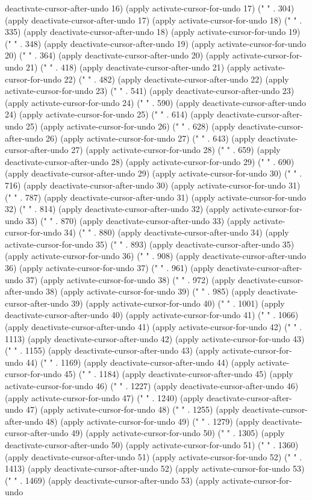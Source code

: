 deactivate-cursor-after-undo 16) (apply activate-cursor-for-undo 17) (" " . 304) (apply deactivate-cursor-after-undo 17) (apply activate-cursor-for-undo 18) (" " . 335) (apply deactivate-cursor-after-undo 18) (apply activate-cursor-for-undo 19) (" " . 348) (apply deactivate-cursor-after-undo 19) (apply activate-cursor-for-undo 20) (" " . 364) (apply deactivate-cursor-after-undo 20) (apply activate-cursor-for-undo 21) (" " . 418) (apply deactivate-cursor-after-undo 21) (apply activate-cursor-for-undo 22) (" " . 482) (apply deactivate-cursor-after-undo 22) (apply activate-cursor-for-undo 23) (" " . 541) (apply deactivate-cursor-after-undo 23) (apply activate-cursor-for-undo 24) (" " . 590) (apply deactivate-cursor-after-undo 24) (apply activate-cursor-for-undo 25) (" " . 614) (apply deactivate-cursor-after-undo 25) (apply activate-cursor-for-undo 26) (" " . 628) (apply deactivate-cursor-after-undo 26) (apply activate-cursor-for-undo 27) (" " . 643) (apply deactivate-cursor-after-undo 27) (apply activate-cursor-for-undo 28) (" " . 659) (apply deactivate-cursor-after-undo 28) (apply activate-cursor-for-undo 29) (" " . 690) (apply deactivate-cursor-after-undo 29) (apply activate-cursor-for-undo 30) (" " . 716) (apply deactivate-cursor-after-undo 30) (apply activate-cursor-for-undo 31) (" " . 787) (apply deactivate-cursor-after-undo 31) (apply activate-cursor-for-undo 32) (" " . 814) (apply deactivate-cursor-after-undo 32) (apply activate-cursor-for-undo 33) (" " . 870) (apply deactivate-cursor-after-undo 33) (apply activate-cursor-for-undo 34) (" " . 880) (apply deactivate-cursor-after-undo 34) (apply activate-cursor-for-undo 35) (" " . 893) (apply deactivate-cursor-after-undo 35) (apply activate-cursor-for-undo 36) (" " . 908) (apply deactivate-cursor-after-undo 36) (apply activate-cursor-for-undo 37) (" " . 961) (apply deactivate-cursor-after-undo 37) (apply activate-cursor-for-undo 38) (" " . 972) (apply deactivate-cursor-after-undo 38) (apply activate-cursor-for-undo 39) (" " . 985) (apply deactivate-cursor-after-undo 39) (apply activate-cursor-for-undo 40) (" " . 1001) (apply deactivate-cursor-after-undo 40) (apply activate-cursor-for-undo 41) (" " . 1066) (apply deactivate-cursor-after-undo 41) (apply activate-cursor-for-undo 42) (" " . 1113) (apply deactivate-cursor-after-undo 42) (apply activate-cursor-for-undo 43) (" " . 1155) (apply deactivate-cursor-after-undo 43) (apply activate-cursor-for-undo 44) (" " . 1169) (apply deactivate-cursor-after-undo 44) (apply activate-cursor-for-undo 45) (" " . 1184) (apply deactivate-cursor-after-undo 45) (apply activate-cursor-for-undo 46) (" " . 1227) (apply deactivate-cursor-after-undo 46) (apply activate-cursor-for-undo 47) (" " . 1240) (apply deactivate-cursor-after-undo 47) (apply activate-cursor-for-undo 48) (" " . 1255) (apply deactivate-cursor-after-undo 48) (apply activate-cursor-for-undo 49) (" " . 1279) (apply deactivate-cursor-after-undo 49) (apply activate-cursor-for-undo 50) (" " . 1305) (apply deactivate-cursor-after-undo 50) (apply activate-cursor-for-undo 51) (" " . 1360) (apply deactivate-cursor-after-undo 51) (apply activate-cursor-for-undo 52) (" " . 1413) (apply deactivate-cursor-after-undo 52) (apply activate-cursor-for-undo 53) (" " . 1469) (apply deactivate-cursor-after-undo 53) (apply activate-cursor-for-undo 